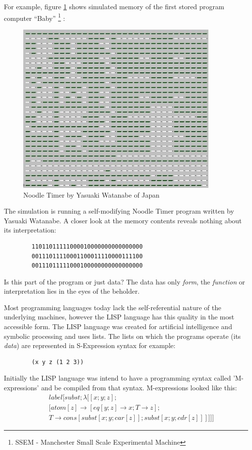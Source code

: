 \documentclass[a4paper,12pt,dvips]{article}
\begin{document}
For example, figure \ref{fig:noodle} shows simulated memory of the first stored program computer ``Baby'' \footnote{SSEM - Manchester Small Scale Experimental Machine} : 
\begin{figure}[ht]
\centering
\includegraphics[width=0.90\textwidth]{noodle}
\caption{Noodle Timer by Yasuaki Watanabe of Japan}
\label{fig:noodle}
\end{figure}
The simulation is running a self-modifying Noodle Timer program written by Yasuaki Watanabe. A closer look at the memory contents reveals nothing about its interpretation: 
\begin{verbatim}
        11011011111000010000000000000000
        00111011110001100011110000111100
        00111011111000100000000000000000
\end{verbatim}
Is this part of the program or just data? The data has only \emph{form}, the \emph{function} or interpretation lies in the eyes of the beholder.

Most programming languages today lack the self-referential nature of the underlying machines, however the LISP language has this quality in the most accessible form. The LISP language was created for artificial intelligence and symbolic processing and uses lists.  The lists on which the programs operate (its \emph{data}) are represented in S-Expression syntax for example:
\begin{verbatim}
        (x y z (1 2 3)) 
\end{verbatim}
Initially the LISP language was intend to have a programming syntax called 'M-expressions' \cite{jmc} and be compiled from that syntax. M-expressions looked like this:
\begin{eqnarray*}
&&label [  subst; \lambda [[x; y; z];   \\
&&[atom [z]  \rightarrow [eq [y; z] \rightarrow x;  T \rightarrow z]; \\
&&T \rightarrow cons [subst [x; y; car [z]]; subst [x; y; cdr [z]]]]]]
\end{eqnarray*}
\end{document}
